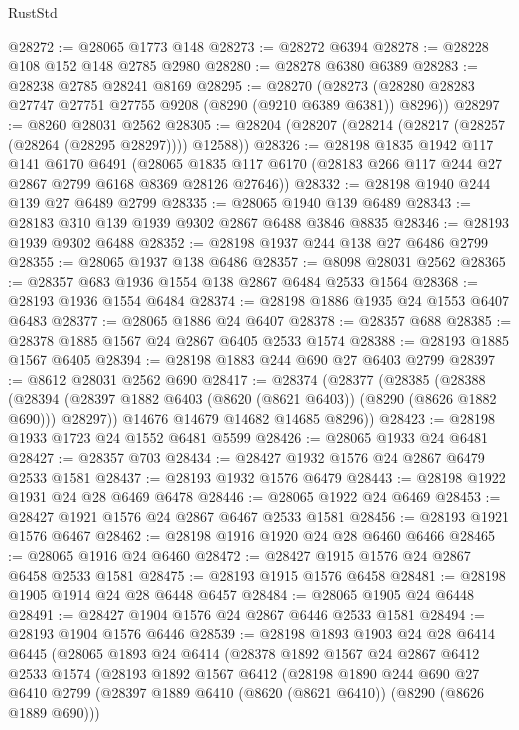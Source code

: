 \begin{lexlean}{RustStd}
\begin{coremodule}
@28272 := @28065 @1773 @148
@28273 := @28272 @6394
@28278 := @28228 @108 @152 @148 @2785 @2980
@28280 := @28278 @6380 @6389
@28283 := @28238 @2785 @28241 @8169
@28295 := @28270
    (@28273 (@28280 @28283 @27747 @27751 @27755 @9208 (@8290 (@9210 @6389 @6381)) @8296))
@28297 := @8260 @28031 @2562
@28305 := @28204 (@28207 (@28214 (@28217 (@28257 (@28264 (@28295 @28297)))) @12588))
@28326 := @28198
    @1835
    @1942
    @117
    @141
    @6170
    @6491
    (@28065 @1835 @117 @6170 (@28183 @266 @117 @244 @27 @2867 @2799 @6168 @8369 @28126 @27646))
@28332 := @28198 @1940 @244 @139 @27 @6489 @2799
@28335 := @28065 @1940 @139 @6489
@28343 := @28183 @310 @139 @1939 @9302 @2867 @6488 @3846 @8835
@28346 := @28193 @1939 @9302 @6488
@28352 := @28198 @1937 @244 @138 @27 @6486 @2799
@28355 := @28065 @1937 @138 @6486
@28357 := @8098 @28031 @2562
@28365 := @28357 @683 @1936 @1554 @138 @2867 @6484 @2533 @1564
@28368 := @28193 @1936 @1554 @6484
@28374 := @28198 @1886 @1935 @24 @1553 @6407 @6483
@28377 := @28065 @1886 @24 @6407
@28378 := @28357 @688
@28385 := @28378 @1885 @1567 @24 @2867 @6405 @2533 @1574
@28388 := @28193 @1885 @1567 @6405
@28394 := @28198 @1883 @244 @690 @27 @6403 @2799
@28397 := @8612 @28031 @2562 @690
@28417 := @28374
    (@28377
      (@28385
        (@28388
          (@28394 (@28397 @1882 @6403 (@8620 (@8621 @6403)) (@8290 (@8626 @1882 @690))) @28297))
        @14676
        @14679
        @14682
        @14685
        @8296))
@28423 := @28198 @1933 @1723 @24 @1552 @6481 @5599
@28426 := @28065 @1933 @24 @6481
@28427 := @28357 @703
@28434 := @28427 @1932 @1576 @24 @2867 @6479 @2533 @1581
@28437 := @28193 @1932 @1576 @6479
@28443 := @28198 @1922 @1931 @24 @28 @6469 @6478
@28446 := @28065 @1922 @24 @6469
@28453 := @28427 @1921 @1576 @24 @2867 @6467 @2533 @1581
@28456 := @28193 @1921 @1576 @6467
@28462 := @28198 @1916 @1920 @24 @28 @6460 @6466
@28465 := @28065 @1916 @24 @6460
@28472 := @28427 @1915 @1576 @24 @2867 @6458 @2533 @1581
@28475 := @28193 @1915 @1576 @6458
@28481 := @28198 @1905 @1914 @24 @28 @6448 @6457
@28484 := @28065 @1905 @24 @6448
@28491 := @28427 @1904 @1576 @24 @2867 @6446 @2533 @1581
@28494 := @28193 @1904 @1576 @6446
@28539 := @28198
    @1893
    @1903
    @24
    @28
    @6414
    @6445
    (@28065
      @1893
      @24
      @6414
      (@28378
        @1892
        @1567
        @24
        @2867
        @6412
        @2533
        @1574
        (@28193
          @1892
          @1567
          @6412
          (@28198
            @1890
            @244
            @690
            @27
            @6410
            @2799
            (@28397 @1889 @6410 (@8620 (@8621 @6410)) (@8290 (@8626 @1889 @690)))

\end{coremodule}
\end{lexlean}
